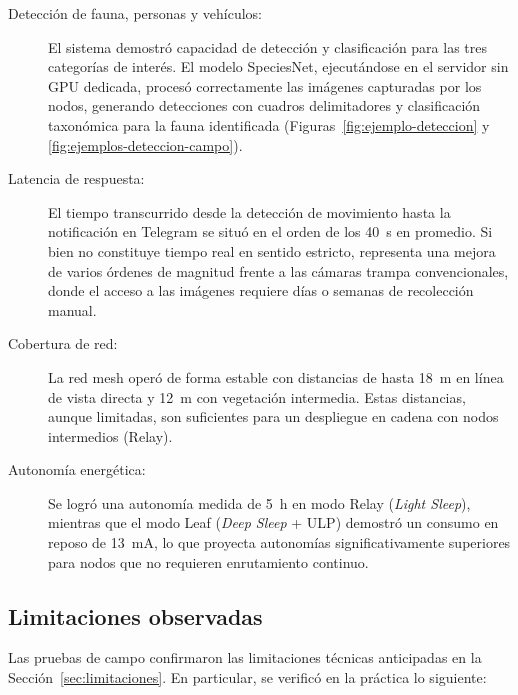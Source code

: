 \documentclass[a4paper, 12pt]{report}
\begin{document}
\begin{description}
  \item[Detección de fauna, personas y vehículos:] El sistema demostró capacidad de detección y clasificación para las tres categorías de interés. El modelo SpeciesNet, ejecutándose en el servidor sin GPU dedicada, procesó correctamente las imágenes capturadas por los nodos, generando detecciones con cuadros delimitadores y clasificación taxonómica para la fauna identificada (Figuras~\ref{fig:ejemplo-deteccion} y \ref{fig:ejemplos-deteccion-campo}).
  \item[Latencia de respuesta:] El tiempo transcurrido desde la detección de movimiento hasta la notificación en Telegram se situó en el orden de los \qty{40}{s} en promedio. Si bien no constituye tiempo real en sentido estricto, representa una mejora de varios órdenes de magnitud frente a las cámaras trampa convencionales, donde el acceso a las imágenes requiere días o semanas de recolección manual.
  \item[Cobertura de red:] La red mesh operó de forma estable con distancias de hasta \qty{18}{m} en línea de vista directa y \qty{12}{m} con vegetación intermedia. Estas distancias, aunque limitadas, son suficientes para un despliegue en cadena con nodos intermedios (Relay).
  \item[Autonomía energética:] Se logró una autonomía medida de \qty{5}{h} en modo Relay (\textit{Light Sleep}), mientras que el modo Leaf (\textit{Deep Sleep} + ULP) demostró un consumo en reposo de \qty{13}{mA}, lo que proyecta autonomías significativamente superiores para nodos que no requieren enrutamiento continuo.
\end{description}

\subsection{Limitaciones observadas}

Las pruebas de campo confirmaron las limitaciones técnicas anticipadas en la Sección~\ref{sec:limitaciones}. En particular, se verificó en la práctica lo siguiente:
\end{document}
